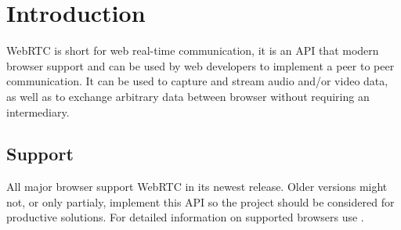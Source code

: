 \clearpage
\chapter{Introduction}
WebRTC is short for web real-time communication, it is an API that modern browser support and can be used by web developers to implement a peer to peer communication. It can be used to capture and stream audio and/or video data, as well as to exchange arbitrary data between browser without requiring an intermediary.

\section{Support}
All major browser support WebRTC in its newest release. Older versions might not, or only partialy, implement this API so the  project should be considered for productive solutions. For detailed information on supported browsers use .